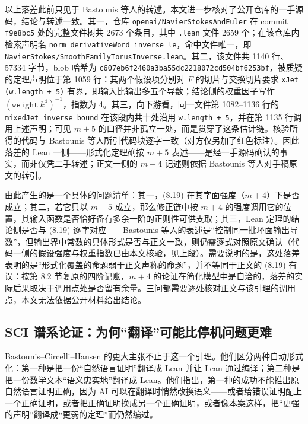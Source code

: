 以上落差此前只见于 Bastounis 等人的转述。本文进一步核对了公开仓库的一手源码，结论与转述一致。其一，仓库 \texttt{openai/}\allowbreak\texttt{NavierStokesAndEuler} 在 commit \texttt{f9e8bc5} 处的完整文件树共 2673 个条目，其中 \texttt{.lean} 文件 2659 个；在该仓库内检索声明名 \texttt{norm\_derivativeWord\_}\allowbreak\texttt{inverse\_le}，命中文件唯一，即 \texttt{NavierStokes/}\allowbreak\texttt{SmoothFamilyTorusInverse.lean}。其二，该文件共 1140 行、57334 字节，blob 哈希为 \texttt{c607eb6f2460}\allowbreak\texttt{a3ba55dc2218}\allowbreak\texttt{072cd504bf62}\allowbreak\texttt{53bf}，被质疑的定理声明位于第 1059 行：其两个假设项分别对 $F$ 的切片与交换切片要求 \texttt{xJet (w.length + 5)} 有界，即输入比输出多五个导数；结论侧的权重因子写作 $(\texttt{weight}\ k^{4})^{-1}$，指数为 4。其三，向下游看，同一文件第 1082--1136 行的 \texttt{mixedJet\_}\allowbreak\texttt{inverse\_bound} 在该段内共十处沿用 \texttt{w.length + 5}，并在第 1135 行调用上述声明；可见 $m+5$ 的口径并非孤立一处，而是贯穿了这条估计链。核验所得的代码与 Bastounis 等人所引代码块逐字一致（对方仅另加了红色标注）。因此落差的 Lean 一侧——形式化定理确按 $m+5$ 表述——是经一手源码确认的事实，而非仅凭二手转述；正文一侧的 $m+4$ 记述则依据 Bastounis 等人对手稿原文的转引。

由此产生的是一个具体的问题清单：其一，(8.19) 在其字面强度（$m+4$）下是否成立；其二，若它只以 $m+5$ 成立，那么修正链中按 $m+4$ 的强度调用它的位置，其输入函数是否恰好备有多余一阶的正则性可供支取；其三，Lean 定理的结论侧是否与 (8.19) 逐字对应——Bastounis 等人的表述是“控制同一批环面输出导数”，但输出界中常数的具体形式是否与正文一致，则仍需逐式对照原文确认（代码一侧的假设强度与权重指数已由本文核验，见上段）。需要说明的是，这处落差表明的是“形式化覆盖的命题弱于正文声称的命题”，并不等同于正文的 (8.19) 有误：按第 8.2 节复原的四阶记账，$m+4$ 的论证在简化模型中是自洽的，落差的实际后果取决于调用点处是否留有余量。三问都需要逐处核对正文与该引理的调用点，本文无法依据公开材料给出结论。

\subsection{SCI 谱系论证：为何“翻译”可能比停机问题更难}

Bastounis--Circelli--Hansen 的更大主张不止于这一个引理。他们区分两种自动形式化：第一种是把一份“自然语言证明”翻译成 Lean 并让 Lean 通过编译；第二种是把一份数学文本“语义忠实地”翻译成 Lean。他们指出，第一种的成功不能推出原自然语言证明正确，因为 AI 可以在翻译时悄然改换语义——或者给错误证明配上一个正确证明，或者把正确证明换成另一个正确证明，或者像本案这样，把“更强的声明”翻译成“更弱的定理”而仍然编过。

